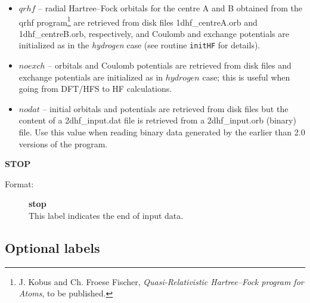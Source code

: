 \documentclass[12pt,a4paper]{article}
\newcommand{\ft}[1]{\texttt{#1}}
\begin{document}
\begin{description}
\begin{description}
\begin{itemize}
\item $qrhf$ -- radial Hartree--Fock orbitals for the centre A and B
  obtained from the qrhf program\footnote{J. Kobus and Ch. Froese
    Fischer, \textsl{Quasi-Relativistic Hartree--Fock program for
      Atoms}, to be published.}  are retrieved from disk files
  1dhf\-\_centreA.\-orb and 1dhf\-\_centreB.\-orb, respectively, and
  Coulomb and exchange potentials are initialized as in the
  \textsl{hydrogen} case (see routine \ft{initHF} for details).

\item $noexch$ -- orbitals and Coulomb potentials are retrieved from disk files and
  exchange potentials are initialized as in $hydrogen$ case; this is useful when going
  from DFT/HFS to HF calculations.

\item $nodat$ -- initial orbitals and potentials are retrieved from disk files but the
  content of a 2dhf\_input.dat file is retrieved from a 2dhf\_input.orb (binary) file. Use
  this value when reading binary data generated by the earlier than 2.0 versions of the
  program.

\end{itemize}
\end{description}



\item \textbf{STOP}
\begin{description}
\item[Format:] \textbf{stop}\\
This label indicates the end of input data.
\end{description}

\end{description}


\subsection{Optional labels}
\end{document}
